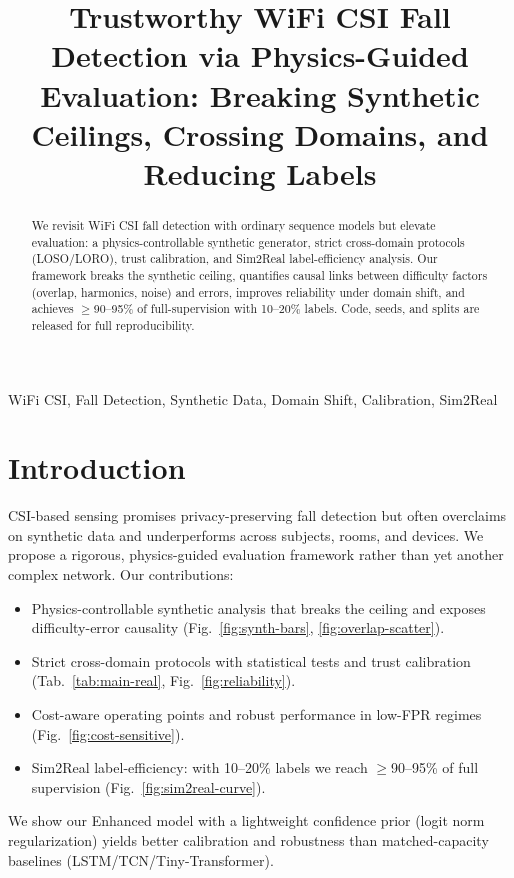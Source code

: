 \documentclass[10pt,conference]{IEEEtran}
\begin{document}
\title{Trustworthy WiFi CSI Fall Detection via Physics-Guided Evaluation: Breaking Synthetic Ceilings, Crossing Domains, and Reducing Labels}

\author{
}

\maketitle

\begin{abstract}
We revisit WiFi CSI fall detection with ordinary sequence models but elevate evaluation: a physics-controllable synthetic generator, strict cross-domain protocols (LOSO/LORO), trust calibration, and Sim2Real label-efficiency analysis. Our framework breaks the synthetic ceiling, quantifies causal links between difficulty factors (overlap, harmonics, noise) and errors, improves reliability under domain shift, and achieves $\geq$90--95\% of full-supervision with 10--20\% labels. Code, seeds, and splits are released for full reproducibility.
\end{abstract}

\begin{IEEEkeywords}
WiFi CSI, Fall Detection, Synthetic Data, Domain Shift, Calibration, Sim2Real
\end{IEEEkeywords}

\section{Introduction}
CSI-based sensing promises privacy-preserving fall detection but often overclaims on synthetic data and underperforms across subjects, rooms, and devices. We propose a rigorous, physics-guided evaluation framework rather than yet another complex network. Our contributions:
\begin{itemize}
  \item Physics-controllable synthetic analysis that breaks the ceiling and exposes difficulty-error causality (Fig.~\ref{fig:synth-bars}, \ref{fig:overlap-scatter}).
  \item Strict cross-domain protocols with statistical tests and trust calibration (Tab.~\ref{tab:main-real}, Fig.~\ref{fig:reliability}).
  \item Cost-aware operating points and robust performance in low-FPR regimes (Fig.~\ref{fig:cost-sensitive}).
  \item Sim2Real label-efficiency: with 10--20\% labels we reach $\geq$90--95\% of full supervision (Fig.~\ref{fig:sim2real-curve}).
\end{itemize}
We show our Enhanced model with a lightweight confidence prior (logit norm regularization) yields better calibration and robustness than matched-capacity baselines (LSTM/TCN/Tiny-Transformer).
\end{document}
